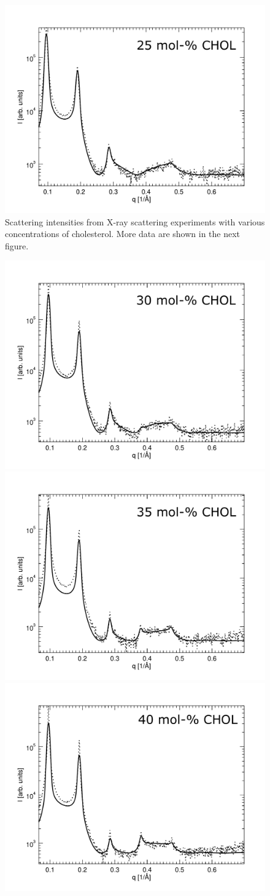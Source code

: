 \documentclass[journal=jpcbfk]{achemso}
\begin{document}
\begin{figure}[htb!]
    \includegraphics[width=0.49\linewidth]{FIGS/scatt25.pdf}
    \caption{Scattering intensities from X-ray scattering experiments with various concentrations of cholesterol. More data are shown in the next figure.}
    \label{SIfig:scattering1}
\end{figure}

\begin{figure}[htb!]
    \centering
    \includegraphics[width=0.49\linewidth]{FIGS/scatt30.pdf}
    \includegraphics[width=0.49\linewidth]{FIGS/scatt35.pdf}\\
    \includegraphics[width=0.49\linewidth]{FIGS/scatt40.pdf}

\end{figure}
\end{document}
